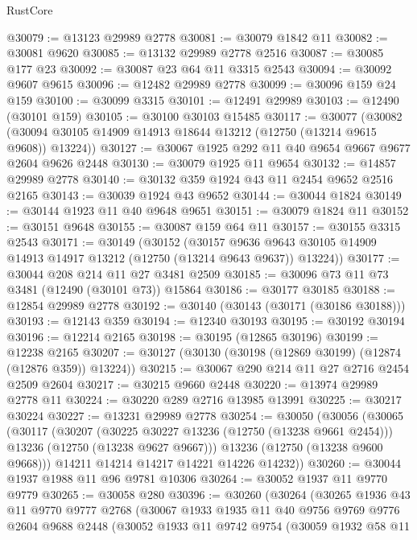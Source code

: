 \begin{lexlean}{RustCore}
\begin{coremodule}
@30079 := @13123 @29989 @2778
@30081 := @30079 @1842 @11
@30082 := @30081 @9620
@30085 := @13132 @29989 @2778 @2516
@30087 := @30085 @177 @23
@30092 := @30087 @23 @64 @11 @3315 @2543
@30094 := @30092 @9607 @9615
@30096 := @12482 @29989 @2778
@30099 := @30096 @159 @24 @159
@30100 := @30099 @3315
@30101 := @12491 @29989
@30103 := @12490 (@30101 @159)
@30105 := @30100 @30103 @15485
@30117 := @30077
    (@30082 (@30094 @30105 @14909 @14913 @18644 @13212 (@12750 (@13214 @9615 @9608)) @13224))
@30127 := @30067 @1925 @292 @11 @40 @9654 @9667 @9677 @2604 @9626 @2448
@30130 := @30079 @1925 @11 @9654
@30132 := @14857 @29989 @2778
@30140 := @30132 @359 @1924 @43 @11 @2454 @9652 @2516 @2165
@30143 := @30039 @1924 @43 @9652
@30144 := @30044 @1824
@30149 := @30144 @1923 @11 @40 @9648 @9651
@30151 := @30079 @1824 @11
@30152 := @30151 @9648
@30155 := @30087 @159 @64 @11
@30157 := @30155 @3315 @2543
@30171 := @30149
    (@30152
      (@30157 @9636 @9643 @30105 @14909 @14913 @14917 @13212 (@12750 (@13214 @9643 @9637)) @13224))
@30177 := @30044 @208 @214 @11 @27 @3481 @2509
@30185 := @30096 @73 @11 @73 @3481 (@12490 (@30101 @73)) @15864
@30186 := @30177 @30185
@30188 := @12854 @29989 @2778
@30192 := @30140 (@30143 (@30171 (@30186 @30188)))
@30193 := @12143 @359
@30194 := @12340 @30193
@30195 := @30192 @30194
@30196 := @12214 @2165
@30198 := @30195 (@12865 @30196)
@30199 := @12238 @2165
@30207 := @30127 (@30130 (@30198 (@12869 @30199) (@12874 (@12876 @359)) @13224))
@30215 := @30067 @290 @214 @11 @27 @2716 @2454 @2509 @2604
@30217 := @30215 @9660 @2448
@30220 := @13974 @29989 @2778 @11
@30224 := @30220 @289 @2716 @13985 @13991
@30225 := @30217 @30224
@30227 := @13231 @29989 @2778
@30254 := @30050
    (@30056
      (@30065
        (@30117
          (@30207
            (@30225 @30227 @13236 (@12750 (@13238 @9661 @2454)))
            @13236
            (@12750 (@13238 @9627 @9667)))
          @13236
          (@12750 (@13238 @9600 @9668)))
        @14211
        @14214
        @14217
        @14221
        @14226
        @14232))
@30260 := @30044 @1937 @1988 @11 @96 @9781 @10306
@30264 := @30052 @1937 @11 @9770 @9779
@30265 := @30058 @280
@30396 := @30260
    (@30264
      (@30265
        @1936
        @43
        @11
        @9770
        @9777
        @2768
        (@30067
          @1933
          @1935
          @11
          @40
          @9756
          @9769
          @9776
          @2604
          @9688
          @2448
          (@30052
            @1933
            @11
            @9742
            @9754
            (@30059
              @1932
              @58
              @11

\end{coremodule}
\end{lexlean}
